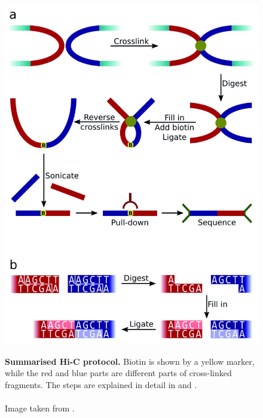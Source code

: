 \begin{figure}[t]
\begin{centering}
    {\includegraphics[scale=4,trim=0 40 0 6, clip]{figures/background/f1000research-4-7903-g0000.jpg}}
    \caption[Summarised Hi-C protocol]
    {\textbf{Summarised Hi-C protocol.}
    Biotin is shown by a yellow marker, while the red and blue parts are
    different parts of cross-linked fragments.
    The steps are explained in detail in  and .
    \\ \\ Image taken from \cite{wingett2015hicup}.}
    \label{fig:HiC}
\end{centering}
\end{figure}

